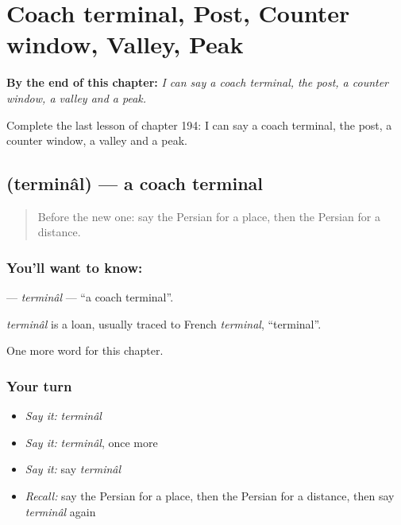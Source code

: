 
\chapter{Coach terminal, Post, Counter window, Valley, Peak}
\label{ch:fa-coach-terminal-post-counter-window-valley-peak}

\begin{chapteropening}
\textbf{By the end of this chapter:} \emph{I can say a coach terminal, the post, a counter window, a valley and a peak.}

Complete the last lesson of chapter 194: I can say a coach terminal, the post, a counter window, a valley and a peak.
\end{chapteropening}

\section[\texorpdfstring{\fa{ترمینال} (terminâl)}{ترمینال (terminâl)}]{ (terminâl) — a coach terminal}

\label{lesson:FA-C194-terminal}



\begin{quote}
Before the new one: say the Persian for a place, then the Persian for a distance.
\end{quote}

\subsection*{You'll want to know: }
\textbf{} — \emph{terminâl} — \textquotedblleft{}a coach terminal\textquotedblright{}.

\begin{cousinweb}
\emph{terminâl} is a loan, usually traced to French \emph{terminal}, \textquotedblleft{}terminal\textquotedblright{}.
\end{cousinweb}

\begin{grammarlens}[title={What you've built}]
One more word for this chapter.
\end{grammarlens}

\subsection*{Your turn}
\begin{itemize}
\raggedright
  \item \emph{Say it:} \emph{terminâl}
  \item \emph{Say it:} \emph{terminâl}, once more
  \item \emph{Say it:} say \emph{terminâl}
  \item \emph{Recall:} say the Persian for a place, then the Persian for a distance, then say \emph{terminâl} again
\end{itemize}

